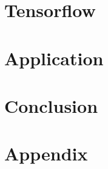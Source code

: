\documentclass[ a4paper 11pt oneside onecolumn final openany ]{report}
\begin{document}
    \chapter{Tensorflow}
    

    \chapter{Application}
    

    \chapter{Conclusion}
    

    \newpage

    
    

    \chapter{Appendix}
    
\end{document}
